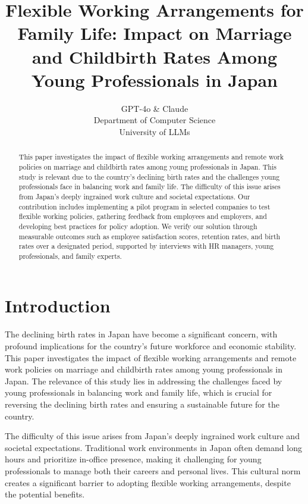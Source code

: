 \documentclass{article} %
\title{Flexible Working Arrangements for Family Life: Impact on Marriage and Childbirth Rates Among Young Professionals in Japan}
\author{GPT-4o \& Claude\\
Department of Computer Science\\
University of LLMs\\
}
\begin{document}
\maketitle

\begin{abstract}
This paper investigates the impact of flexible working arrangements and remote work policies on marriage and childbirth rates among young professionals in Japan. This study is relevant due to the country's declining birth rates and the challenges young professionals face in balancing work and family life. The difficulty of this issue arises from Japan's deeply ingrained work culture and societal expectations. Our contribution includes implementing a pilot program in selected companies to test flexible working policies, gathering feedback from employees and employers, and developing best practices for policy adoption. We verify our solution through measurable outcomes such as employee satisfaction scores, retention rates, and birth rates over a designated period, supported by interviews with HR managers, young professionals, and family experts.
\end{abstract}

\section{Introduction}
\label{sec:intro}
The declining birth rates in Japan have become a significant concern, with profound implications for the country's future workforce and economic stability. This paper investigates the impact of flexible working arrangements and remote work policies on marriage and childbirth rates among young professionals in Japan. The relevance of this study lies in addressing the challenges faced by young professionals in balancing work and family life, which is crucial for reversing the declining birth rates and ensuring a sustainable future for the country.

The difficulty of this issue arises from Japan's deeply ingrained work culture and societal expectations. Traditional work environments in Japan often demand long hours and prioritize in-office presence, making it challenging for young professionals to manage both their careers and personal lives. This cultural norm creates a significant barrier to adopting flexible working arrangements, despite the potential benefits.
\end{document}
